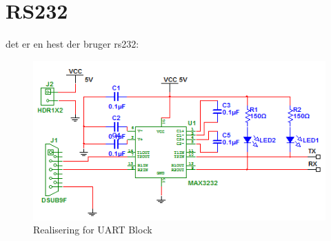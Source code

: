 \chapter{RS232}
det er en hest der bruger rs232:
\begin{figure}[H]
\centering
\includegraphics[width=1.0\textwidth]{billeder/HWUART}
\caption{Realisering for UART Block}
\label{fig:SMHWUARTB}
\end{figure}